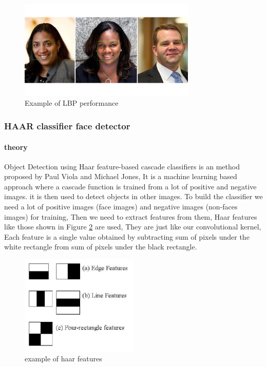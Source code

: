 \begin{figure}
	\centering
	\includegraphics[width=0.75\textwidth]{images/lbp_example.jpg}
	\caption{Example of LBP performance}
	\label{fig:LBP_example}
\end{figure}


\subsubsection{HAAR classifier face detector}

\paragraph{theory}
Object Detection using Haar feature-based cascade classifiers is an method proposed by Paul Viola and Michael Jones\cite{haar}, It is a machine learning based approach where a cascade function is trained from a lot of positive and negative images. it is then used to detect objects in other images.
\newline
To build the classifier we need a lot of positive images (face images) and negative images (non-faces images) for training, Then we need to extract features from them, Haar features like those shown in Figure \ref{fig:haar_features} are used, They are just like our convolutional kernel, Each feature is a single value obtained by subtracting sum of pixels under the white rectangle from sum of pixels under the black rectangle.

\begin{figure}
	\centering
	\includegraphics[width=0.5\textwidth]{images/haar_features.jpg}
	\caption{example of haar features}
	\label{fig:haar_features}
\end{figure}


